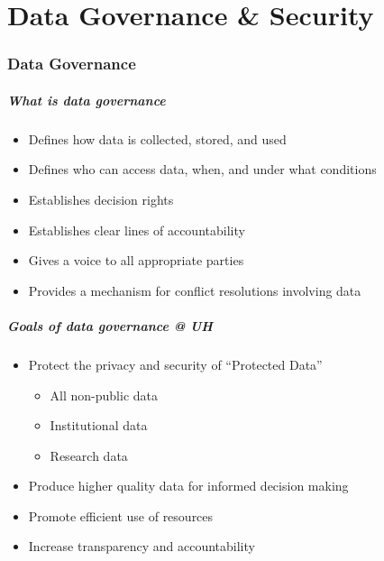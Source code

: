 \part{Data Governance \& Security}
\begin{frame}
			 \partpage
\end{frame}

\section[Data Governance]{Data Governance}

\begin{frame}
  \frametitle{What is data governance}
  \begin{itemize}
  \item Defines how data is collected, stored, and used
  \item Defines who can access data, when, and under what conditions
  \item Establishes decision rights
  \item Establishes clear lines of accountability
  \item Gives a voice to all appropriate parties
  \item Provides a mechanism for conflict resolutions involving data
  \end{itemize}
\end{frame}


\begin{frame}
  \frametitle{Goals of data governance @ UH}  
  \begin{itemize}
  \item Protect the privacy and security of ``Protected Data''
    \begin{itemize}
    \item All non-public data
    \item Institutional data
    \item Research data
    \end{itemize}
  \item Produce higher quality data for informed decision making
  \item Promote efficient use of resources
  \item Increase transparency and accountability
  \end{itemize}
\end{frame}


